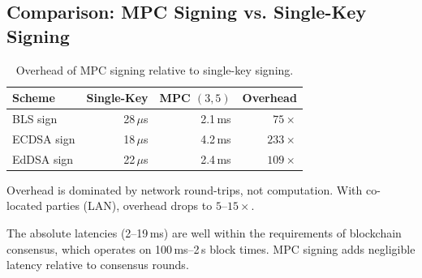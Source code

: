 \subsection{Comparison: MPC Signing vs. Single-Key Signing}

\begin{table}[ht]
\centering
\caption{Overhead of MPC signing relative to single-key signing.}
\label{tab:overhead}
\begin{tabular}{lrrr}
\toprule
\textbf{Scheme} & \textbf{Single-Key} & \textbf{MPC $(3,5)$} & \textbf{Overhead} \\
\midrule
BLS sign & 28\,$\mu$s & 2.1\,ms & $75\times$ \\
ECDSA sign & 18\,$\mu$s & 4.2\,ms & $233\times$ \\
EdDSA sign & 22\,$\mu$s & 2.4\,ms & $109\times$ \\
\bottomrule
\end{tabular}
\vspace{0.3em}
\footnotesize{Overhead is dominated by network round-trips, not computation.
With co-located parties (LAN), overhead drops to $5\text{--}15\times$.}
\end{table}

The absolute latencies (2--19\,ms) are well within the requirements of blockchain
consensus, which operates on 100\,ms--2\,s block times. MPC signing adds negligible
latency relative to consensus rounds.

